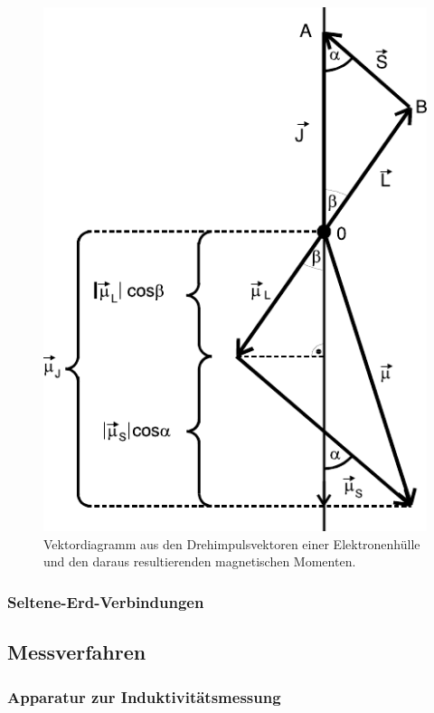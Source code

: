 \begin{figure}[H]
	\label{fig:diagramm}
	\centering
	\includegraphics{content/diagramm.pdf}
	\caption{Vektordiagramm aus den Drehimpulsvektoren einer Elektronenhülle und den daraus resultierenden magnetischen
		Momenten.}
\end{figure}

\subsubsection{Seltene-Erd-Verbindungen}

\subsection{Messverfahren}

\subsubsection{Apparatur zur Induktivitätsmessung}

